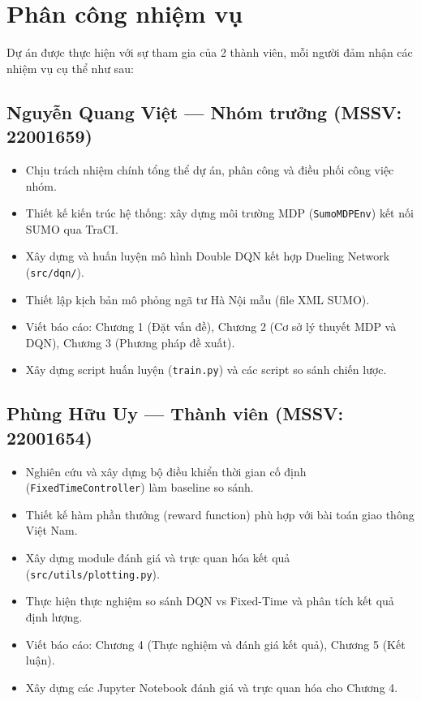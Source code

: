 \section*{Phân công nhiệm vụ}

Dự án được thực hiện với sự tham gia của 2 thành viên, mỗi người đảm nhận các nhiệm vụ cụ thể như sau:

\subsection*{Nguyễn Quang Việt --- Nhóm trưởng (MSSV: 22001659)}
\begin{itemize}
    \item Chịu trách nhiệm chính tổng thể dự án, phân công và điều phối công việc nhóm.
    \item Thiết kế kiến trúc hệ thống: xây dựng môi trường MDP (\texttt{SumoMDPEnv}) kết nối SUMO qua TraCI.
    \item Xây dựng và huấn luyện mô hình Double DQN kết hợp Dueling Network (\texttt{src/dqn/}).
    \item Thiết lập kịch bản mô phỏng ngã tư Hà Nội mẫu (file XML SUMO).
    \item Viết báo cáo: Chương 1 (Đặt vấn đề), Chương 2 (Cơ sở lý thuyết MDP và DQN), Chương 3 (Phương pháp đề xuất).
    \item Xây dựng script huấn luyện (\texttt{train.py}) và các script so sánh chiến lược.
\end{itemize}

\subsection*{Phùng Hữu Uy --- Thành viên (MSSV: 22001654)}
\begin{itemize}
    \item Nghiên cứu và xây dựng bộ điều khiển thời gian cố định (\texttt{FixedTimeController}) làm baseline so sánh.
    \item Thiết kế hàm phần thưởng (reward function) phù hợp với bài toán giao thông Việt Nam.
    \item Xây dựng module đánh giá và trực quan hóa kết quả (\texttt{src/utils/plotting.py}).
    \item Thực hiện thực nghiệm so sánh DQN vs Fixed-Time và phân tích kết quả định lượng.
    \item Viết báo cáo: Chương 4 (Thực nghiệm và đánh giá kết quả), Chương 5 (Kết luận).
    \item Xây dựng các Jupyter Notebook đánh giá và trực quan hóa cho Chương 4.
\end{itemize}

